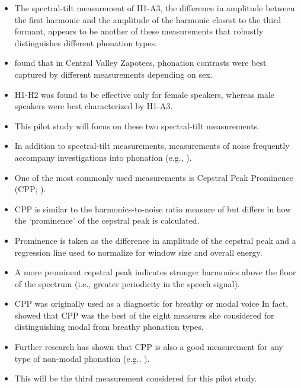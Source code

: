 \documentclass[12pt, letterpaper]{article}
\begin{document}
\begin{itemize}
	\item The spectral-tilt measurement of H1-A3, the difference in amplitude between the first harmonic and the amplitude of the harmonic closest to the third formant, appears to be another of these measurements that robustly distinguishes different phonation types. 
	\item \citet{espositoVariationContrastivePhonation2010} found that in Central Valley Zapotecs, phonation contrasts were best captured by different measurements depending on sex. 
	\item H1-H2 was found to be effective only for female speakers, whereas male speakers were best characterized by H1-A3. 
	\item This pilot study will focus on these two spectral-tilt measurements.
	\item In addition to spectral-tilt measurements, measurements of noise frequently accompany investigations into phonation (e.g., \cite{garellekPhoneticsWhiteHmong2021}).
	\item One of the most commonly used measurements is Cepstral Peak Prominence (CPP; \cite{hillenbrandAcousticCorrelatesBreathy1994,hillenbrandAcousticCorrelatesBreathy1996}). 
	\item CPP is similar to the harmonics-to-noise ratio measure of \citet{dekromCepstrumBasedTechniqueDetermining1993} but differs in how the ‘prominence’ of the cepstral peak is calculated. 
	\item Prominence is taken as the difference in amplitude of the cepstral peak and a regression line used to normalize for window size and overall energy.
	\item A more prominent cepstral peak indicates stronger harmonics above the floor of the spectrum (i.e., greater periodicity in the speech signal).
	\item CPP was originally used as a diagnostic for breathy or modal voice \citep{blankenshipTimingNonmodalPhonation2002,espositoVariationContrastivePhonation2010} In fact, \citeauthor{espositoEffectsLinguisticExperience2010} showed that CPP was the best of the eight measures she considered for distinguishing modal from breathy phonation types.
	\item Further research has shown that CPP is also a good measurement for any type of non-modal phonation (e.g., \cite{andruskiPhonationTypesProduction2000,andruskiToneClarityMixed2006,blankenshipTimingNonmodalPhonation2002,waylandAcousticCorrelatesBreathy2003,avelinoAcousticElectroglottographicAnalyses2010}). 
	\item This will be the third measurement considered for this pilot study. 
\end{itemize}
\end{document}
